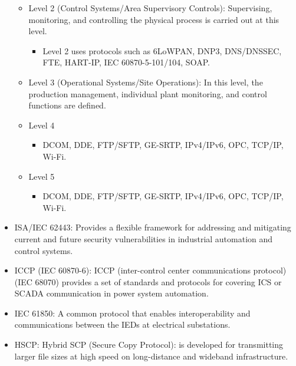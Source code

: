 \begin{itemize}
\begin{itemize}
        \item Level 2 (Control Systems/Area Supervisory Controls): Supervising, monitoring, and controlling the physical process is carried out at this level.
        \begin{itemize}
            \item Level 2 uses protocols such as 6LoWPAN, DNP3, DNS/DNSSEC, FTE, HART-IP, IEC 60870-5-101/104, SOAP.
        \end{itemize}
        \item Level 3 (Operational Systems/Site Operations): In this level, the production management, individual plant monitoring, and control functions are defined.
        \item Level 4
        \begin{itemize}
            \item DCOM, DDE, FTP/SFTP, GE-SRTP, IPv4/IPv6, OPC, TCP/IP, Wi-Fi.
        \end{itemize}
        \item Level 5
        \begin{itemize}
            \item DCOM, DDE, FTP/SFTP, GE-SRTP, IPv4/IPv6, OPC, TCP/IP, Wi-Fi.
        \end{itemize}
    \end{itemize}
    \item ISA/IEC 62443: Provides a flexible framework for addressing and mitigating current and future security vulnerabilities in industrial automation and control systems.
    \item ICCP (IEC 60870-6): ICCP (inter-control center communications protocol) (IEC 68070) provides a set of standards and protocols for covering ICS or SCADA communication in power system automation.
    \item IEC 61850: A common protocol that enables interoperability and communications between the IEDs at electrical substations.
    \item HSCP: Hybrid SCP (Secure Copy Protocol): is developed for transmitting larger file sizes at high speed on long-distance and wideband infrastructure.
\end{itemize}
